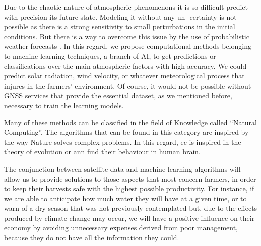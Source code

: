 Due to the chaotic nature of atmospheric phenomenons it is so difficult predict with precision its future state. Modeling it without any un- certainty is not possible as there is a strong sensitivity to small perturbations in the initial conditions. But there is a way to overcome this issue by the use of probabilistic weather forecasts \cite{martinez2015forecasting}. In this regard, we propose computational methods belonging to machine learning techniques, a branch of AI, to get predictions or classifications over the main atmospheric factors with high accuracy. We could predict solar radiation, wind velocity, or whatever meteorological process that injures in the farmers' environment. Of course, it would not be possible without GNSS services that provide the essential dataset, as we mentioned before, necessary to train the learning models.

Many of these methods can be classified in the field of Knowledge called “Natural Computing”. The algorithms that can be found in this category are inspired by the way Nature solves complex problems. In this regard, \gls{ec} is inspired in the theory of evolution or \gls{ann} find their behaviour in human brain.

The conjunction between satellite data and machine learning algorithms will allow us to provide solutions to those aspects that most concern farmers, in order to keep their harvests safe with the highest possible productivity. For instance, if we are able to anticipate how much water they will have at a given time, or to warn of a dry season that was not previously contemplated but, due to the effects produced by climate change may occur, we will have a positive influence on their economy by avoiding unnecessary expenses derived from poor management, because they do not have all the information they could.

